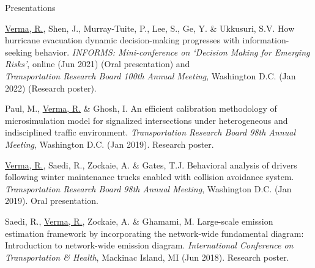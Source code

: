 \documentclass{CV} %
\begin{document}
\begin{rSection}{Presentations}
\begin{etaremune}
        \item \underline{Verma, R.}, Shen, J., Murray-Tuite, P., Lee, S., Ge, Y. \& Ukkusuri, S.V. How hurricane evacuation dynamic decision-making progresses with information-seeking behavior. \textit{INFORMS: Mini-conference on `Decision Making for Emerging Risks'}, online (Jun 2021) (Oral presentation) and
        \\ \textit{Transportation Research Board 100th Annual Meeting}, Washington D.C. (Jan 2022) (Research poster).
    
        \item Paul, M., \underline{Verma, R.} \& Ghosh, I. An efficient calibration methodology of microsimulation model for signalized intersections under heterogeneous and indisciplined traffic environment. \textit{Transportation Research Board 98th Annual Meeting}, Washington D.C. (Jan 2019). Research poster.
        
        \item \underline{Verma, R.}, Saedi, R., Zockaie, A. \& Gates, T.J. Behavioral analysis of drivers following winter maintenance trucks enabled with collision avoidance system. \textit{Transportation Research Board 98th Annual Meeting}, Washington D.C. (Jan 2019). Oral presentation.

        \item Saedi, R., \underline{Verma, R.}, Zockaie, A. \& Ghamami, M. Large-scale emission estimation framework by incorporating the network-wide fundamental diagram: Introduction to network-wide emission diagram. \textit{International Conference on Transportation \& Health}, Mackinac Island, MI (Jun 2018). Research poster.
    \end{etaremune}
\end{rSection}
\end{document}
